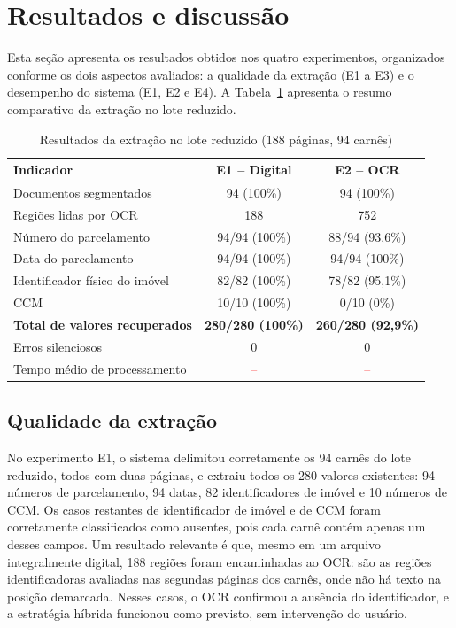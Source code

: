 \documentclass[article,12pt,oneside,a4paper,english,brazil]{abntex2}
\newcommand{\pendente}[1]{\textcolor{red}{#1}}
\newcommand{\TEMPODIG}{\pendente{--}}
\newcommand{\TEMPOOCR}{\pendente{--}}
\begin{document}
\section{Resultados e discussão}\label{sec:resultados}

Esta seção apresenta os resultados obtidos nos quatro experimentos, organizados
conforme os dois aspectos avaliados: a qualidade da extração (E1 a E3) e o desempenho do
sistema (E1, E2 e E4). A Tabela~\ref{tab:extracao} apresenta o resumo comparativo da
extração no lote reduzido.

\begin{table}[htb]
\centering
\footnotesize
\caption{Resultados da extração no lote reduzido (188 páginas, 94 carnês)}\label{tab:extracao}
\begin{tabular}{lcc}
\toprule
Indicador & E1 -- Digital & E2 -- OCR \\
\midrule
Documentos segmentados & 94 (100\%) & 94 (100\%) \\
Regiões lidas por OCR & 188 & 752 \\
Número do parcelamento & 94/94 (100\%) & 88/94 (93,6\%) \\
Data do parcelamento & 94/94 (100\%) & 94/94 (100\%) \\
Identificador físico do imóvel & 82/82 (100\%) & 78/82 (95,1\%) \\
CCM & 10/10 (100\%) & 0/10 (0\%) \\
\textbf{Total de valores recuperados} & \textbf{280/280 (100\%)} & \textbf{260/280 (92,9\%)} \\
Erros silenciosos & 0 & 0 \\
Tempo médio de processamento & \TEMPODIG{} & \TEMPOOCR{} \\
\bottomrule
\end{tabular}
\end{table}

\subsection{Qualidade da extração}

No experimento E1, o sistema delimitou corretamente os 94 carnês do lote reduzido, todos
com duas páginas, e extraiu todos os 280 valores existentes: 94 números de parcelamento,
94 datas, 82 identificadores de imóvel e 10 números de CCM. Os casos restantes de
identificador de imóvel e de CCM foram corretamente classificados como ausentes, pois
cada carnê contém apenas um desses campos. Um resultado relevante é que, mesmo em um
arquivo integralmente digital, 188 regiões foram encaminhadas ao OCR: são as regiões
identificadoras avaliadas nas segundas páginas dos carnês, onde não há texto na posição
demarcada. Nesses casos, o OCR confirmou a ausência do identificador, e a estratégia
híbrida funcionou como previsto, sem intervenção do usuário.
\end{document}
